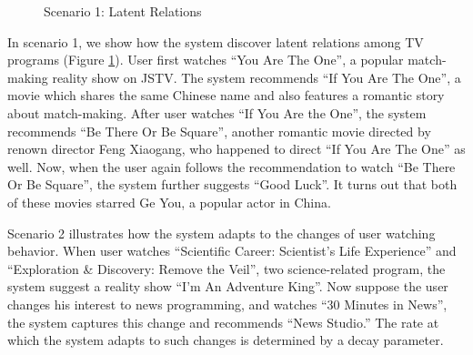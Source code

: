 \begin{figure}[h]
\begin{center}
\caption{Scenario 1: Latent Relations}
\label{fig:scenario1} 
\end{center}
\end{figure}

In scenario 1, we show how the system discover latent relations among
TV programs (Figure \ref{fig:scenario1}).
User first watches ``You Are The One'', 
a popular match-making reality
show on JSTV. The system recommends ``If You Are The One'', a movie which
shares the same Chinese name and also features a romantic story 
about match-making. After user watches ``If You Are the One'', 
the system recommends ``Be There Or Be Square'', another romantic movie 
directed by renown director Feng Xiaogang, who happened to direct 
``If You Are The One'' as well. Now, when the user again follows the
recommendation to watch ``Be There Or Be Square'', the system further
suggests ``Good Luck''. It turns out that both of these movies starred
Ge You, a popular actor in China.

%

Scenario 2 illustrates how the system adapts to the changes of user watching
behavior. When user watches 
``Scientific Career: Scientist's Life Experience'' 
and ``Exploration \& Discovery: Remove the Veil'', two science-related
program, the system suggest a reality show ``I'm An Adventure King''. 
Now suppose the user changes his interest to news programming, and 
watches ``30 Minutes in News'', the system captures this change
and recommends ``News Studio.'' The rate at which the system adapts to
such changes is determined by a decay parameter.


